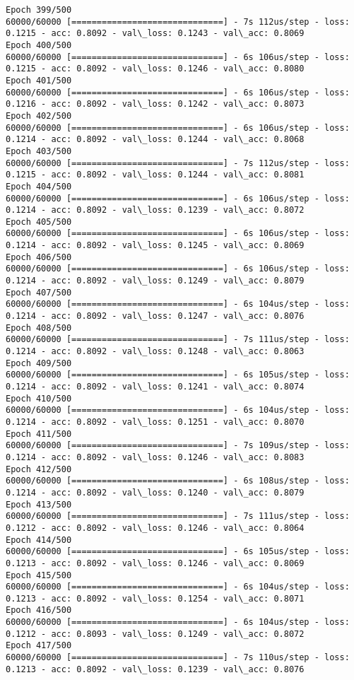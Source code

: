 \documentclass[11pt]{article}
\begin{document}
\begin{Verbatim}[commandchars=\\\{\}]
Epoch 399/500
60000/60000 [==============================] - 7s 112us/step - loss: 0.1215 - acc: 0.8092 - val\_loss: 0.1243 - val\_acc: 0.8069
Epoch 400/500
60000/60000 [==============================] - 6s 106us/step - loss: 0.1215 - acc: 0.8092 - val\_loss: 0.1246 - val\_acc: 0.8080
Epoch 401/500
60000/60000 [==============================] - 6s 106us/step - loss: 0.1216 - acc: 0.8092 - val\_loss: 0.1242 - val\_acc: 0.8073
Epoch 402/500
60000/60000 [==============================] - 6s 106us/step - loss: 0.1214 - acc: 0.8092 - val\_loss: 0.1244 - val\_acc: 0.8068
Epoch 403/500
60000/60000 [==============================] - 7s 112us/step - loss: 0.1215 - acc: 0.8092 - val\_loss: 0.1244 - val\_acc: 0.8081
Epoch 404/500
60000/60000 [==============================] - 6s 106us/step - loss: 0.1214 - acc: 0.8092 - val\_loss: 0.1239 - val\_acc: 0.8072
Epoch 405/500
60000/60000 [==============================] - 6s 106us/step - loss: 0.1214 - acc: 0.8092 - val\_loss: 0.1245 - val\_acc: 0.8069
Epoch 406/500
60000/60000 [==============================] - 6s 106us/step - loss: 0.1214 - acc: 0.8092 - val\_loss: 0.1249 - val\_acc: 0.8079
Epoch 407/500
60000/60000 [==============================] - 6s 104us/step - loss: 0.1214 - acc: 0.8092 - val\_loss: 0.1247 - val\_acc: 0.8076
Epoch 408/500
60000/60000 [==============================] - 7s 111us/step - loss: 0.1214 - acc: 0.8092 - val\_loss: 0.1248 - val\_acc: 0.8063
Epoch 409/500
60000/60000 [==============================] - 6s 105us/step - loss: 0.1214 - acc: 0.8092 - val\_loss: 0.1241 - val\_acc: 0.8074
Epoch 410/500
60000/60000 [==============================] - 6s 104us/step - loss: 0.1214 - acc: 0.8092 - val\_loss: 0.1251 - val\_acc: 0.8070
Epoch 411/500
60000/60000 [==============================] - 7s 109us/step - loss: 0.1214 - acc: 0.8092 - val\_loss: 0.1246 - val\_acc: 0.8083
Epoch 412/500
60000/60000 [==============================] - 6s 108us/step - loss: 0.1214 - acc: 0.8092 - val\_loss: 0.1240 - val\_acc: 0.8079
Epoch 413/500
60000/60000 [==============================] - 7s 111us/step - loss: 0.1212 - acc: 0.8092 - val\_loss: 0.1246 - val\_acc: 0.8064
Epoch 414/500
60000/60000 [==============================] - 6s 105us/step - loss: 0.1213 - acc: 0.8092 - val\_loss: 0.1246 - val\_acc: 0.8069
Epoch 415/500
60000/60000 [==============================] - 6s 104us/step - loss: 0.1213 - acc: 0.8092 - val\_loss: 0.1254 - val\_acc: 0.8071
Epoch 416/500
60000/60000 [==============================] - 6s 104us/step - loss: 0.1212 - acc: 0.8093 - val\_loss: 0.1249 - val\_acc: 0.8072
Epoch 417/500
60000/60000 [==============================] - 7s 110us/step - loss: 0.1213 - acc: 0.8092 - val\_loss: 0.1239 - val\_acc: 0.8076

\end{Verbatim}
\end{document}
